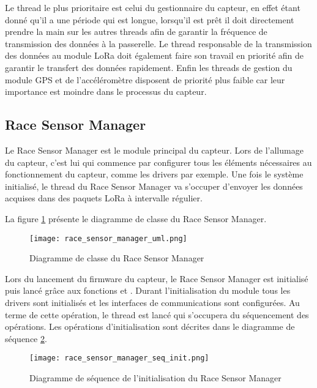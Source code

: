Le thread le plus prioritaire est celui du gestionnaire du capteur, en effet étant donné qu'il a une période qui est longue, lorsqu'il est prêt il doit directement prendre la main sur les autres threads afin de garantir la fréquence de transmission des données à la passerelle.
Le thread responsable de la transmission des données au module LoRa doit également faire son travail en priorité afin de garantir le transfert des données rapidement.
Enfin les threads de gestion du module GPS et de l'accéléromètre disposent de priorité plus faible car leur importance est moindre dans le processus du capteur.

\subsection{Race Sensor Manager}

Le Race Sensor Manager est le module principal du capteur. Lors de l'allumage du capteur, c'est lui qui commence par configurer tous les éléments nécessaires au fonctionnement du capteur, comme les drivers par exemple. Une fois le système initialisé, le thread du Race Sensor Manager va s'occuper d'envoyer les données acquises dans des paquets LoRa à intervalle régulier.

La figure \ref{fig:race_sensor_manager_uml} présente le diagramme de classe du Race Sensor Manager.

\begin{figure}[htb]
\centering 
\texttt{[image: race\_sensor\_manager\_uml.png]} 
\caption{Diagramme de classe du Race Sensor Manager}
\label{fig:race_sensor_manager_uml}
\end{figure}

Lors du lancement du firmware du capteur, le Race Sensor Manager est initialisé puis lancé grâce aux fonctions  et . Durant l'initialisation du module tous les drivers sont initialisés et les interfaces de communications sont configurées. Au terme de cette opération, le thread est lancé qui s'occupera du séquencement des opérations. Les opérations d'initialisation sont décrites dans le diagramme de séquence \ref{fig:race_sensor_manager_init_seq}.

\begin{figure}[htb]
\centering 
\texttt{[image: race\_sensor\_manager\_seq\_init.png]} 
\caption{Diagramme de séquence de l'initialisation du Race Sensor Manager}
\label{fig:race_sensor_manager_init_seq}
\end{figure}

